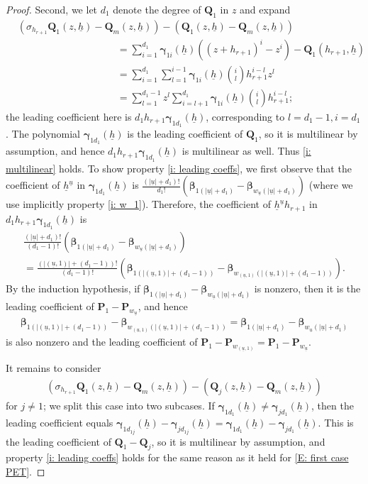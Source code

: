 \documentclass[11pt]{amsart}
\theoremstyle{definition}
\newcommand{\p}{{\textbf{P}}}
\newcommand{\bq}{{\textbf{Q}}}
\newcommand{\q}{{\textbf{Q}}}
\newcommand{\bgamma}{{\boldsymbol{\gamma}}}
\newcommand{\bbeta}{{\boldsymbol{\beta}}}
\newcommand{\uh}{{\underline{h}}}
\newcommand{\uu}{{\underline{u}}}
\newcommand{\brac}[1]{\mathopen{}\left( #1 \mathclose{}\right)}
\begin{document}
\begin{proof}
        Second, we let $d_1$ denote the degree of $\q_1$ in $z$ and expand
    \begin{align}\label{E: second case PET}
        &(\sigma_{h_{r+1}}{\q}_1(z,\uh)-{\q}_m(z,\uh)) - ({\q}_1(z,\uh)-{\q}_m(z,\uh))\\ 
        \nonumber &\qquad\qquad\qquad\qquad\qquad= \sum_{i=1}^{d_1}\bgamma_{1i}(\uh)\brac{(z+h_{r+1})^i-z^i}-\bq_1(h_{r+1}, \uh)\\
        \nonumber &\qquad\qquad\qquad\qquad\qquad= \sum_{i=1}^{d_1}\sum_{l=1}^{i-1}\bgamma_{1i}(\uh){{{i}\choose{l}}}h_{r+1}^{i-l}z^l\\
        \nonumber &\qquad\qquad\qquad\qquad\qquad= \sum_{l=1}^{d_1-1}z^l \sum_{i=l+1}^{d_1}\bgamma_{1i}(\uh){{{i}\choose{l}}}h_{r+1}^{i-l};
    \end{align}
        the leading coefficient here is $d_1h_{r+1} \bgamma_{1d_1}(\uh)$, corresponding to $l=d_1-1, i=d_1$. The polynomial $\bgamma_{1d_1}(\uh)$ is the leading coefficient of $\bq_1$, so it is multilinear by assumption, and hence $d_1h_{r+1} \bgamma_{1d_1}(\uh)$ is multilinear as well. Thus \eqref{i: multilinear} holds. To show property \eqref{i: leading coeffs}, we first observe that the coefficient of $\uh^\uu$ in $\bgamma_{1d_1}(\uh)$ is $\frac{(|\uu|+d_1)!}{d_1!} (\bbeta_{1(|\uu|+d_1)}-\bbeta_{w_{\uu}(|\uu|+d_1)})$ (where we use implicitly property \eqref{i: w_1}). Therefore, the coefficient of $\uh^\uu h_{r+1}$ in $d_1h_{r+1} \bgamma_{1d_1}(\uh)$ is
        \begin{multline*}
            \frac{(|\uu|+d_1)!}{(d_1-1)!} (\bbeta_{1(|\uu|+d_1)}-\bbeta_{w_{\uu}(|\uu|+d_1)})\\
            = \frac{(|(\uu,1)|+(d_1-1))!}{(d_1-1)!} (\bbeta_{1(|(\uu,1)|+(d_1-1))}-\bbeta_{w_{(\uu,1)}(|(\uu,1)|+(d_1-1))}).
        \end{multline*}
        By the induction hypothesis, if $\bbeta_{1(|\uu|+d_1)}-\bbeta_{w_{\uu}(|\uu|+d_1)}$ is nonzero, then it is the leading coefficient of $\p_1-\p_{w_{\uu}}$, and hence
        \begin{align*}
            \bbeta_{1(|(\uu,1)|+(d_1-1))}-\bbeta_{w_{(\uu,1)}(|(\uu,1)|+(d_1-1))} = \bbeta_{1(|\uu|+d_1)}-\bbeta_{w_{\uu}(|\uu|+d_1)}
        \end{align*}
        is also nonzero and the leading coefficient of $\p_1 - \p_{w_{(\uu,1)}} = \p_1 - \p_{w_{\uu}}$.
        
        It remains to consider
        \begin{align*}
            (\sigma_{h_{r+1}}{\q}_1(z,\uh)-{\q}_m(z,\uh)) - ({\q}_j(z,\uh)-{\q}_m(z,\uh))
        \end{align*}
        {for $j \neq 1$}; we split this case into two subcases. If $\bgamma_{1 d_1}(\uh)\neq \bgamma_{jd_1}(\uh)$, then the leading coefficient equals $\bgamma_{1d_{1j}}(\uh)-\bgamma_{jd_{1j}}(\uh) = \bgamma_{1 d_1}(\uh)-\bgamma_{jd_1}(\uh)$. This is the leading coefficient of $\q_1 - \q_j$, so it is multilinear by assumption, and property \eqref{i: leading coeffs} holds for the same reason as it held for \eqref{E: first case PET}.
        

\end{proof}
\end{document}
